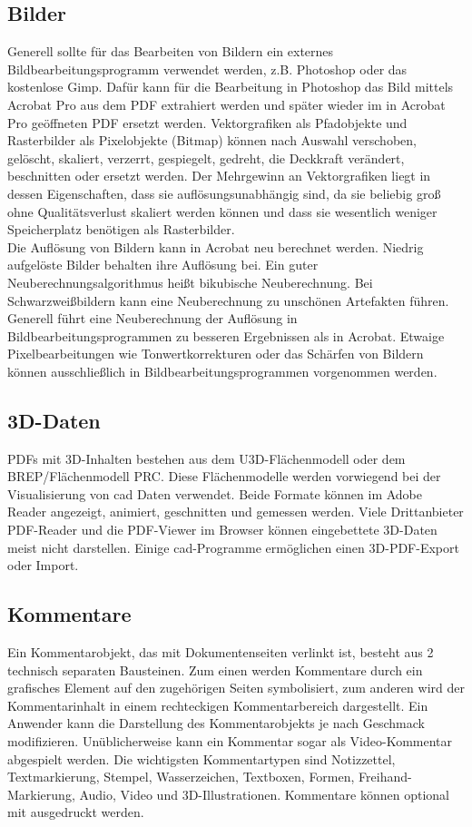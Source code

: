 \subsection{Bilder}
Generell sollte für das Bearbeiten von Bildern ein externes Bildbearbeitungsprogramm verwendet werden, z.B. Photoshop oder das kostenlose Gimp. Dafür kann für die Bearbeitung in Photoshop das Bild mittels Acrobat Pro aus dem PDF extrahiert werden und später wieder im in Acrobat Pro geöffneten PDF ersetzt werden. Vektorgrafiken als Pfadobjekte und Rasterbilder als Pixelobjekte (Bitmap) können nach Auswahl verschoben, gelöscht, skaliert, verzerrt, gespiegelt, gedreht, die Deckkraft verändert, beschnitten oder ersetzt werden. \cite{schneeberger} Der Mehrgewinn an Vektorgrafiken liegt in dessen Eigenschaften, dass sie auflösungsunabhängig sind, da sie beliebig groß ohne Qualitätsverlust skaliert werden können und dass sie wesentlich weniger Speicherplatz benötigen als Rasterbilder. \\
Die Auflösung von Bildern kann in Acrobat neu berechnet werden. Niedrig aufgelöste Bilder behalten ihre Auflösung bei. Ein guter Neuberechnungsalgorithmus heißt bikubische Neuberechnung. Bei Schwarzweißbildern kann eine Neuberechnung zu unschönen Artefakten führen. \cite{buehler} Generell führt eine Neuberechnung der Auflösung in Bildbearbeitungsprogrammen zu besseren Ergebnissen als in Acrobat. Etwaige Pixelbearbeitungen wie Tonwertkorrekturen oder das Schärfen von Bildern können ausschließlich in Bildbearbeitungsprogrammen vorgenommen werden. 

\subsection{3D-Daten}
PDFs mit 3D-Inhalten bestehen aus dem U3D-Flächenmodell oder dem BREP/Flächenmodell PRC. Diese Flächenmodelle werden vorwiegend bei der Visualisierung von \gls{cad} Daten verwendet. Beide Formate können im Adobe Reader angezeigt, animiert, geschnitten und gemessen werden. Viele Drittanbieter PDF-Reader und die PDF-Viewer im Browser können eingebettete 3D-Daten meist nicht darstellen. Einige \gls{cad}-Programme ermöglichen einen 3D-PDF-Export oder Import. \cite{wiki-pdf-de}

\subsection{Kommentare}
Ein Kommentarobjekt, das mit Dokumentenseiten verlinkt ist, besteht aus 2 technisch separaten Bausteinen. Zum einen werden Kommentare durch ein grafisches Element auf den zugehörigen Seiten symbolisiert, zum anderen wird der Kommentarinhalt in einem rechteckigen Kommentarbereich dargestellt. Ein Anwender kann die Darstellung des Kommentarobjekts je nach Geschmack modifizieren. Unüblicherweise kann ein Kommentar sogar als Video-Kommentar abgespielt werden. Die wichtigsten Kommentartypen sind Notizzettel, Textmarkierung, Stempel, Wasserzeichen, Textboxen, Formen, Freihand-Markierung, Audio, Video und 3D-Illustrationen. Kommentare können optional mit ausgedruckt werden. \cite{softx}

